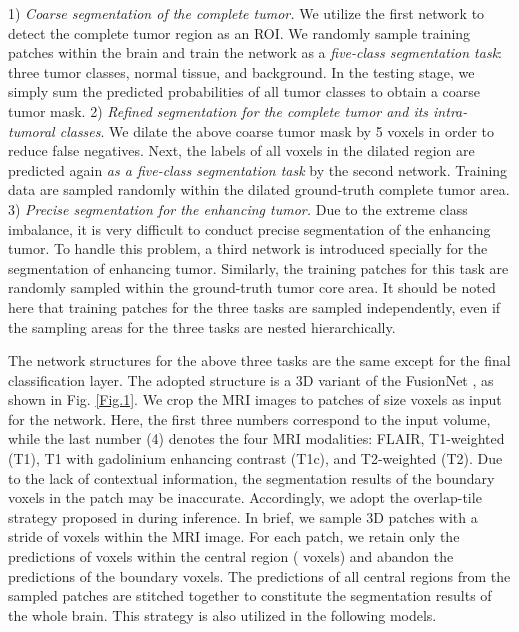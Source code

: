 \documentclass[journal,twoside]{IEEEtran}
\begin{document}
1) \emph{Coarse segmentation of the complete tumor.} 
We utilize the first network to detect the complete tumor region as an ROI. We randomly sample training patches within the brain and train the network as a \emph{five-class segmentation task}: three tumor classes, normal tissue, and background. In the testing stage, we simply sum the predicted probabilities of all tumor classes to obtain a coarse tumor mask.
2) \emph{Refined segmentation for the complete tumor and its intra-tumoral classes}. We dilate the above coarse tumor mask by 5 voxels in order to reduce false negatives. Next, the labels of all voxels in the dilated region are predicted again \emph{as a five-class segmentation task} by the second network. Training data are sampled randomly within the dilated ground-truth complete tumor area. 
3) \emph{Precise segmentation for the enhancing tumor.} Due to the extreme class imbalance, it is very difficult to conduct precise segmentation of the enhancing tumor. To handle this problem, a third network is introduced specially for the segmentation of enhancing tumor. Similarly, the training patches for this task are  randomly sampled within the ground-truth tumor core area. It should be noted here that training patches for the three tasks are sampled independently, even if the sampling areas for the three tasks are nested hierarchically.



The network structures for the above three tasks are the same except for the final classification layer. The adopted structure is a 3D variant of the FusionNet \cite{quan2016fusionnet}, as shown in Fig. \ref{Fig.1}. We crop the MRI images to patches of size  voxels as input for the network. Here, the first three numbers correspond to the input volume, while the last number (4) denotes the four MRI modalities: FLAIR, T1-weighted (T1), T1 with gadolinium enhancing contrast (T1c), and T2-weighted (T2). Due to the lack of contextual information, the segmentation results of the boundary voxels in the patch may be inaccurate. Accordingly, we adopt the overlap-tile strategy proposed in \cite{ronneberger2015u} during inference. In brief, we sample 3D patches with a stride of  voxels within the MRI image. For each patch, we retain only the predictions of voxels within the central region ( voxels) and abandon the predictions of the boundary voxels. The predictions of all central regions from the sampled patches are stitched together to constitute the segmentation results of the whole brain. This strategy is also utilized in the following models. 
\end{document}
